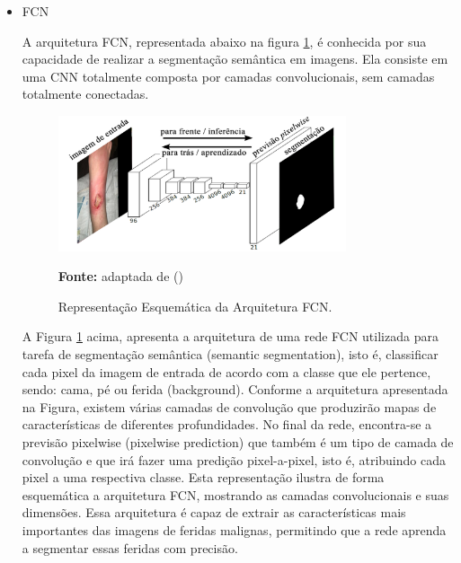         \begin{itemize}
            
            
        \item {FCN}
        
            A arquitetura \ac{FCN}, representada abaixo na figura \ref{fig:arquiteturaFCN},  é conhecida por sua capacidade de realizar a segmentação semântica em imagens. Ela consiste em uma \ac{CNN} totalmente composta por camadas convolucionais, sem camadas totalmente conectadas. 
    
            \begin{figure}[htbp]
                \centering
                \caption{Representação Esquemática da Arquitetura \ac{FCN}.}
                \includegraphics[width=0.8\textwidth]{img/arquitetura_FCN.png}
                \label{fig:arquiteturaFCN}
                \par\medskip\textbf{Fonte:} adaptada de (\cite{long2015fully})
            \end{figure}
            
            A Figura \ref{fig:arquiteturaFCN} acima, apresenta a arquitetura de uma rede \ac{FCN} utilizada para tarefa de segmentação semântica (semantic segmentation), isto é, classificar cada pixel da imagem de entrada de acordo com a classe que ele pertence, sendo: cama, pé ou ferida (background). Conforme a arquitetura apresentada na Figura, existem várias camadas de convolução que produzirão mapas de características de diferentes profundidades. No final da rede, encontra-se a previsão pixelwise (pixelwise prediction) que também é um tipo de camada de convolução e que irá fazer uma predição pixel-a-pixel, isto é, atribuindo cada pixel a uma respectiva classe. Esta representação ilustra de forma esquemática a arquitetura \ac{FCN}, mostrando as camadas convolucionais e suas dimensões. Essa arquitetura é capaz de extrair as características mais importantes das imagens de feridas malignas, permitindo que a rede aprenda a segmentar essas feridas com precisão. 
    

\end{itemize}
